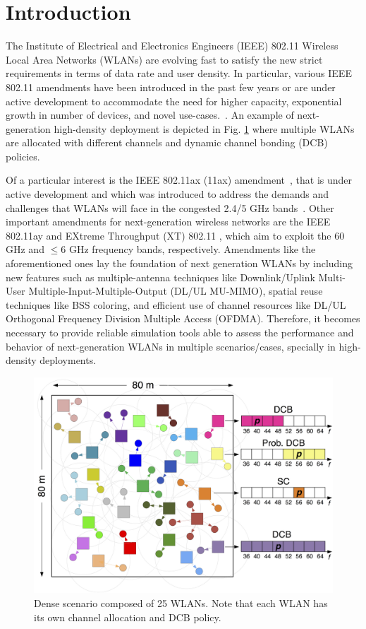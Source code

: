 \documentclass[conference]{IEEEtran}
\begin{document}
	\section{Introduction}
	\label{section:introduction}
	
	The Institute of Electrical and Electronics Engineers (IEEE) 802.11 Wireless Local Area Networks (WLANs) are evolving fast to satisfy the new strict requirements in terms of data rate and user density. In particular, various IEEE 802.11 amendments have been introduced in the past few years or are under active development to accommodate the need for higher capacity, exponential growth in number of devices, and novel use-cases.~\cite{8485317_selOA}. An example of next-generation high-density deployment is depicted in Fig. \ref{fig:map_dense} where multiple WLANs are allocated with different channels and dynamic channel bonding (DCB) policies.
	
	Of a particular interest is the IEEE 802.11ax (11ax) amendment~\cite{tgax2017draft}, that is under active development and which was introduced to address the demands and challenges that WLANs will face in the congested 2.4/5 GHz bands~\cite{7422404_bellalta11ax}. Other important amendments for next-generation wireless networks are the IEEE 802.11ay \cite{ghasempour2017ieee} and EXtreme Throughput (XT) 802.11 \cite{xtreme_throughput}, which aim to exploit the 60 GHz and $\leq 6$ GHz frequency bands, respectively. Amendments like the aforementioned ones lay the foundation of next generation WLANs by including new features such as multiple-antenna techniques like Downlink/Uplink Multi-User Multiple-Input-Multiple-Output (DL/UL MU-MIMO), spatial reuse techniques like BSS coloring, and efficient use of channel resources like DL/UL Orthogonal Frequency Division Multiple Access (OFDMA). Therefore, it becomes necessary to provide reliable simulation tools able to assess the performance and behavior of next-generation WLANs in multiple scenarios/cases, specially in high-density deployments.
	
	\begin{figure}[t]
		\centering	
		\includegraphics[width=0.75\columnwidth]{map_central.png}
		\caption{Dense scenario composed of 25 WLANs. Note that each WLAN has its own channel allocation and DCB policy.}
		\label{fig:map_dense}
	\end{figure}
	
\end{document}
